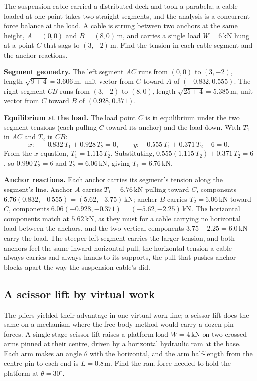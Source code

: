 The suspension cable carried a distributed deck and took a parabola; a cable
loaded at one point takes two straight segments, and the analysis is a
concurrent-force balance at the load. A cable is strung between two anchors
at the same height, $A = (0,0)$ and $B = (8, 0)\,\si{\meter}$, and carries a
single load $W = 6\,\text{kN}$ hung at a point $C$ that sags to
$(3, -2)\,\si{\meter}$. Find the tension in each cable segment and the anchor
reactions.

\textbf{Segment geometry.} The left segment $AC$ runs from $(0,0)$ to
$(3, -2)$, length $\sqrt{9 + 4} = 3.606\,\si{\meter}$, unit vector from $C$
toward $A$ of $({-0.832}, 0.555)$. The right segment $CB$ runs from
$(3, -2)$ to $(8, 0)$, length $\sqrt{25 + 4} = 5.385\,\si{\meter}$, unit
vector from $C$ toward $B$ of $(0.928, 0.371)$.

\textbf{Equilibrium at the load.} The load point $C$ is in equilibrium under
the two segment tensions (each pulling $C$ toward its anchor) and the load
down. With $T_1$ in $AC$ and $T_2$ in $CB$:
\[
x:\quad {-0.832}\,T_1 + 0.928\,T_2 = 0, \qquad
y:\quad 0.555\,T_1 + 0.371\,T_2 - 6 = 0.
\]
From the $x$ equation, $T_1 = 1.115\,T_2$. Substituting,
$0.555(1.115\,T_2) + 0.371\,T_2 = 6$, so $0.990\,T_2 = 6$ and
$T_2 = 6.06\,\text{kN}$, giving $T_1 = 6.76\,\text{kN}$.

\textbf{Anchor reactions.} Each anchor carries its segment's tension along
the segment's line. Anchor $A$ carries $T_1 = 6.76\,\text{kN}$ pulling
toward $C$, components $6.76(0.832, -0.555) = (5.62, -3.75)\,\text{kN}$;
anchor $B$ carries $T_2 = 6.06\,\text{kN}$ toward $C$, components
$6.06({-0.928}, -0.371) = ({-5.62}, -2.25)\,\text{kN}$. The horizontal
components match at $5.62\,\text{kN}$, as they must for a cable carrying no
horizontal load between the anchors, and the two vertical components
$3.75 + 2.25 = 6.0\,\text{kN}$ carry the load. The steeper left segment
carries the larger tension, and both anchors feel the same inward horizontal
pull, the horizontal tension a cable always carries and always hands to its
supports, the pull that pushes anchor blocks apart the way the suspension
cable's did.

\subsection{A scissor lift by virtual work}

The pliers yielded their advantage in one virtual-work line; a scissor lift
does the same on a mechanism where the free-body method would carry a dozen
pin forces. A single-stage scissor lift raises a platform load
$W = 4\,\text{kN}$ on two crossed arms pinned at their centre, driven by a
horizontal hydraulic ram at the base. Each arm makes an angle $\theta$ with
the horizontal, and the arm half-length from the centre pin to each end is
$L = 0.8\,\si{\meter}$. Find the ram force needed to hold the platform at
$\theta = 30^\circ$.

